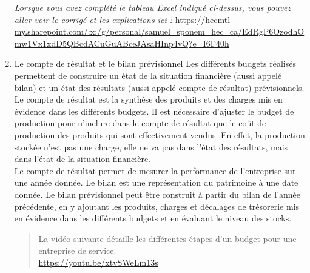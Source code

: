 \documentclass{tufte-handout}
\begin{document}
\begin{enumerate}
\emph{Lorsque vous avez complété le tableau Excel indiqué ci-dessus, vous pouvez aller voir le corrigé et les explications ici :} \url{https://hecmtl-my.sharepoint.com/:x:/g/personal/samuel\_sponem\_hec\_ca/EdRgP6OzodhOmw1Vx1xdD5QBcdACuGuABceJAsaHInp4vQ?e=I6F40h}\\

\item Le compte de résultat et le bilan prévisionnel
\label{sec:org0c92822}
Les différents budgets réalisés permettent de construire un état de la situation financière (aussi appelé bilan) et un état des résultats (aussi appelé compte de résultat) prévisionnels. Le compte de résultat est la synthèse des produits et des charges mis en évidence dans les différents budgets. Il est nécessaire d'ajuster le budget de production pour n'inclure dans le compte de résultat que le coût de production des produits qui sont effectivement vendus. En effet, la production stockée n'est pas une charge, elle ne va pas dans l'état des résultats, mais dans l'état de la situation financière.\\
Le compte de résultat permet de mesurer la performance de l'entreprise sur une année donnée. Le bilan est une représentation du patrimoine à une date donnée. Le bilan prévisionnel peut être construit à partir du bilan de l'année précédente, en y ajoutant les produits, charges et décalages de trésorerie mis en évidence dans les différents budgets et en évaluant le niveau des stocks.\\
\begin{quote}
La vidéo suivante détaille les différentes étapes d'un budget pour une entreprise de service.\\
\url{https://youtu.be/xtvSWeLm13s}\\
\end{quote}
\end{enumerate}
\end{document}
